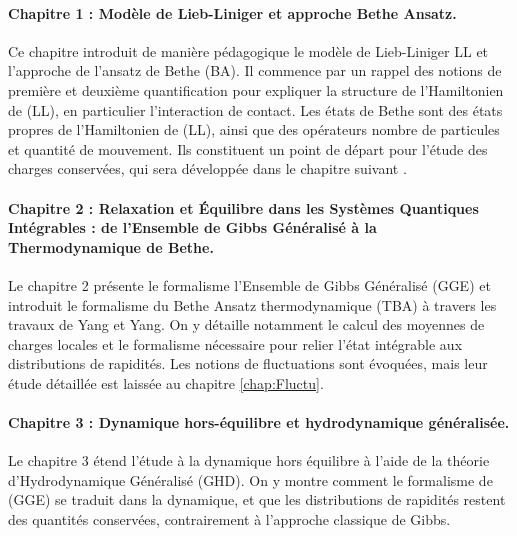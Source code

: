
\paragraph{Chapitre 1 : Modèle de Lieb-Liniger et approche Bethe Ansatz.}  
Ce chapitre introduit de manière pédagogique le modèle de Lieb-Liniger \gls{LL} et l’approche de l’ansatz de Bethe (\acrshort{BA}). Il commence par un rappel des notions de première et deuxième quantification pour expliquer la structure de l’Hamiltonien de (\acrshort{LL}), en particulier l’interaction de contact. Les états de Bethe sont des états propres de l’Hamiltonien de (\acrshort{LL}), ainsi que des opérateurs nombre de particules et quantité de mouvement. Ils constituent un point de départ pour l’étude des charges conservées, qui sera développée dans le chapitre suivant \cite{Caux_2011}.

\paragraph{Chapitre 2 : Relaxation et Équilibre dans les Systèmes Quantiques Intégrables : de l’Ensemble de Gibbs Généralisé à la Thermodynamique de Bethe.}  
Le chapitre 2 présente le formalisme l'Ensemble de Gibbs Généralisé (\acrshort{GGE}) et introduit le formalisme du Bethe Ansatz thermodynamique (\acrshort{TBA}) à travers les travaux de Yang et Yang. On y détaille notamment le calcul des moyennes de charges locales et le formalisme nécessaire pour relier l’état intégrable aux distributions de rapidités. Les notions de fluctuations sont évoquées, mais leur étude détaillée est laissée au chapitre \ref{chap:Fluctu}.


\paragraph{Chapitre 3 : Dynamique hors-équilibre et hydrodynamique généralisée.}  
Le chapitre 3 étend l’étude à la dynamique hors équilibre à l’aide de la théorie d'Hydrodynamique Généralisé (\acrshort{GHD}). On y montre comment le formalisme de (\acrshort{GGE}) se traduit dans la dynamique, et que les distributions de rapidités restent des quantités conservées, contrairement à l’approche classique de Gibbs.

